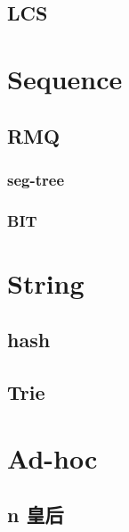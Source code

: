 \subsection{LCS}


\section{Sequence}

\subsection{RMQ}
\subsubsection{seg-tree}


\subsubsection{BIT}

% 

\section{String}

\subsection{hash}


\subsection{Trie}


\section{Ad-hoc}

\subsection{n 皇后}

